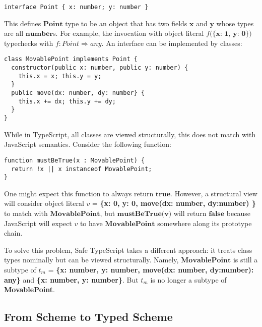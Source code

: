 \begin{verbatim}
interface Point { x: number; y: number }
\end{verbatim}

This defines $\textbf{Point}$ type to be an object that has two fields $\textbf{x}$
and $\textbf{y}$ whose types are all $\textbf{number}$s.
For example, the invocation with object literal $f(\textbf{\{x: 1, y: 0\})}$ typechecks
with $f : Point \Rightarrow any$.
An interface can be implemented by classes:

\begin{verbatim}
class MovablePoint implements Point {
  constructor(public x: number, public y: number) {
    this.x = x; this.y = y;
  }
  public move(dx: number, dy: number} {
    this.x += dx; this.y += dy;
  }
}
\end{verbatim}

While in TypeScript, all classes are viewed structurally, this does not match
with JavaScript semantics. Consider the following function:

\begin{verbatim}
function mustBeTrue(x : MovablePoint) {
  return !x || x instanceof MovablePoint;
}
\end{verbatim}

One might expect this function to always return $\textbf{true}$.
However, a structural view will consider object literal
$v$ = \textbf{\{x: 0, y: 0, move(dx: number, dy:number) {}\}}
to match with $\textbf{MovablePoint}$, but $\textbf{mustBeTrue(v)}$
will return $\textbf{false}$ because JavaScript will expect $v$ to have
$\textbf{MovablePoint}$ somewhere along its prototype chain.

To solve this problem, Safe TypeScript takes a different approach:
it treats class types nominally but can be viewed structurally.
Namely, $\textbf{MovablePoint}$ is still a subtype of
$t_m$ = \textbf{\{x: number, y: number, move(dx: number, dy:number): any\}}
and \textbf{\{x: number, y: number\}}.
But $t_m$ is no longer a subtype of \textbf{MovablePoint}.





\subsection{From Scheme to Typed Scheme}

